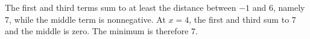 The first and third terms sum to at least the distance between $-1$ and $6$, namely $7$, while the middle term is nonnegative. At $x=4$, the first and third sum to $7$ and the middle is zero. The minimum is therefore $\boxed7$.
